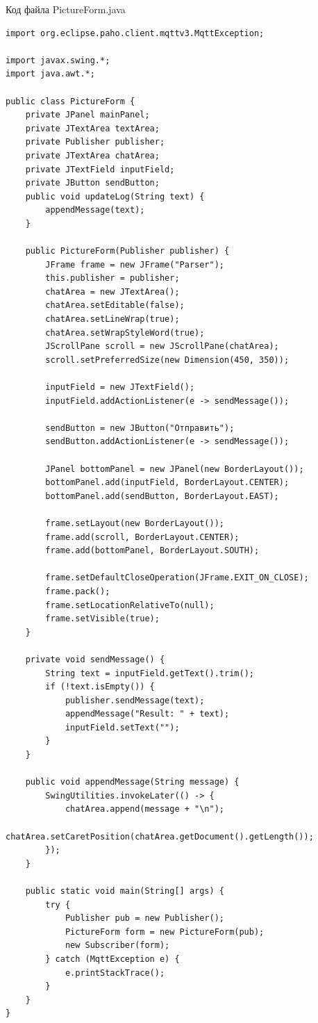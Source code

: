 \documentclass[a4paper, 14pt]{extarticle}
\begin{document}
\par
Код файла PictureForm.java
\begin{lstlisting}
import org.eclipse.paho.client.mqttv3.MqttException;

import javax.swing.*;
import java.awt.*;

public class PictureForm {
    private JPanel mainPanel;
    private JTextArea textArea;
    private Publisher publisher;
    private JTextArea chatArea;
    private JTextField inputField;
    private JButton sendButton;
    public void updateLog(String text) {
        appendMessage(text);
    }

    public PictureForm(Publisher publisher) {
        JFrame frame = new JFrame("Parser");
        this.publisher = publisher;
        chatArea = new JTextArea();
        chatArea.setEditable(false);
        chatArea.setLineWrap(true);
        chatArea.setWrapStyleWord(true);
        JScrollPane scroll = new JScrollPane(chatArea);
        scroll.setPreferredSize(new Dimension(450, 350));

        inputField = new JTextField();
        inputField.addActionListener(e -> sendMessage());

        sendButton = new JButton("Отправить");
        sendButton.addActionListener(e -> sendMessage());

        JPanel bottomPanel = new JPanel(new BorderLayout());
        bottomPanel.add(inputField, BorderLayout.CENTER);
        bottomPanel.add(sendButton, BorderLayout.EAST);

        frame.setLayout(new BorderLayout());
        frame.add(scroll, BorderLayout.CENTER);
        frame.add(bottomPanel, BorderLayout.SOUTH);

        frame.setDefaultCloseOperation(JFrame.EXIT_ON_CLOSE);
        frame.pack();
        frame.setLocationRelativeTo(null);
        frame.setVisible(true);
    }

    private void sendMessage() {
        String text = inputField.getText().trim();
        if (!text.isEmpty()) {
            publisher.sendMessage(text);
            appendMessage("Result: " + text);
            inputField.setText("");
        }
    }

    public void appendMessage(String message) {
        SwingUtilities.invokeLater(() -> {
            chatArea.append(message + "\n");
            chatArea.setCaretPosition(chatArea.getDocument().getLength());
        });
    }

    public static void main(String[] args) {
        try {
            Publisher pub = new Publisher();
            PictureForm form = new PictureForm(pub);
            new Subscriber(form);
        } catch (MqttException e) {
            e.printStackTrace();
        }
    }
}
\end{lstlisting}
\end{document}
